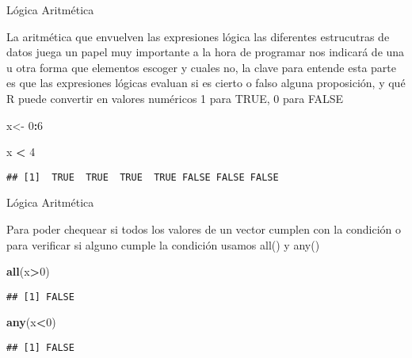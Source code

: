 \documentclass[ignorenonframetext,]{beamer}
\newenvironment{Shaded}{\begin{snugshade}}{\end{snugshade}}
\newcommand{\KeywordTok}[1]{\textcolor[rgb]{0.13,0.29,0.53}{\textbf{#1}}}
\newcommand{\DecValTok}[1]{\textcolor[rgb]{0.00,0.00,0.81}{#1}}
\newcommand{\StringTok}[1]{\textcolor[rgb]{0.31,0.60,0.02}{#1}}
\newcommand{\OperatorTok}[1]{\textcolor[rgb]{0.81,0.36,0.00}{\textbf{#1}}}
\newcommand{\NormalTok}[1]{#1}
\begin{document}
\begin{frame}[fragile]{Lógica Aritmética}

La aritmética que envuelven las expresiones lógica las diferentes
estrucutras de datos juega un papel muy importante a la hora de
programar nos indicará de una u otra forma que elementos escoger y
cuales no, la clave para entende esta parte es que las expresiones
lógicas evaluan si es cierto o falso alguna proposición, y qué R puede
convertir en valores numéricos 1 para TRUE, 0 para FALSE

\begin{Shaded}
\begin{Highlighting}[]
\NormalTok{x<-}\StringTok{ }\DecValTok{0}\OperatorTok{:}\DecValTok{6}
\end{Highlighting}
\end{Shaded}

\begin{Shaded}
\begin{Highlighting}[]
\NormalTok{x }\OperatorTok{<}\StringTok{ }\DecValTok{4}
\end{Highlighting}
\end{Shaded}

\begin{verbatim}
## [1]  TRUE  TRUE  TRUE  TRUE FALSE FALSE FALSE
\end{verbatim}

\end{frame}

\begin{frame}[fragile]{Lógica Aritmética}

Para poder chequear si todos los valores de un vector cumplen con la
condición o para verificar si alguno cumple la condición usamos all() y
any()

\begin{Shaded}
\begin{Highlighting}[]
\KeywordTok{all}\NormalTok{(x}\OperatorTok{>}\DecValTok{0}\NormalTok{)}
\end{Highlighting}
\end{Shaded}

\begin{verbatim}
## [1] FALSE
\end{verbatim}

\begin{Shaded}
\begin{Highlighting}[]
\KeywordTok{any}\NormalTok{(x}\OperatorTok{<}\DecValTok{0}\NormalTok{)}
\end{Highlighting}
\end{Shaded}

\begin{verbatim}
## [1] FALSE
\end{verbatim}

\end{frame}
\end{document}
